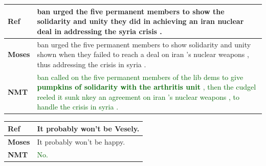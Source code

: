 \documentclass[landscape]{jhuslides3C}
\begin{document}
\vspace{10mm}
\begin{center}
\begin{tabular}{|p{3cm}|p{20cm}|}
\textbf{Ref} & ban urged the five permanent members to show the solidarity and unity they did in achieving an iran nuclear deal in addressing the syria crisis .\\[1cm] \hline \hline
\textbf{Moses} & \textcolor{verydarkorange}{ban urged the five permanent members to show solidarity and unity shown when they failed to reach a deal on iran 's nuclear weapons , thus addressing the crisis in syria .} \\[1cm] \hline \hline
\textbf{NMT} & \textcolor{darkgreen}{ban called on the five permanent members of the lib dems to give \textbf{pumpkins of solidarity with the arthritis unit} , then the cudgel reeled it sunk nkey an agreement on iran 's nuclear weapons , to handle the crisis in syria .}
\end{tabular}
\end{center}

\vspace{10mm}
\begin{center}
\begin{tabular}{|p{3cm}|p{20cm}|}
\textbf{Ref} & It probably won't be Vesely.\\[1cm] \hline \hline
\textbf{Moses} & \textcolor{verydarkorange}{It probably won't be happy.} \\[1cm] \hline \hline
\textbf{NMT} & \textcolor{darkgreen}{No.}
\end{tabular}
\end{center}
\end{document}
